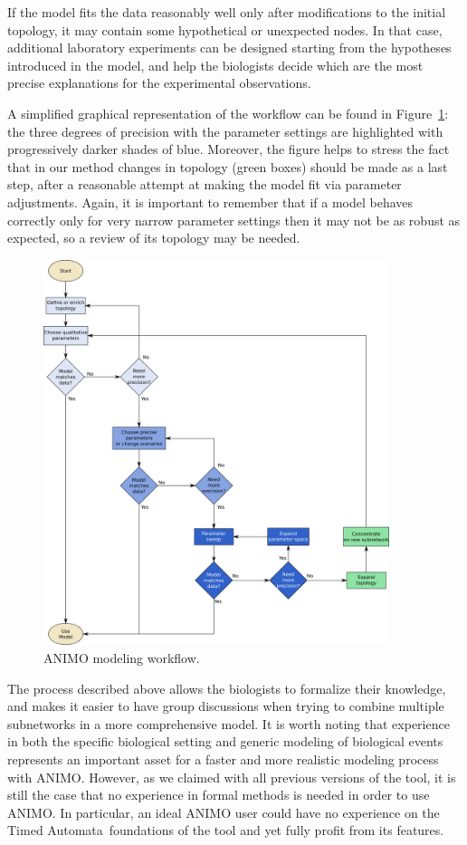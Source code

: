 \documentclass[submission,copyright,creativecommons]{eptcs}
\def\tas{Timed Automata}
\begin{document}
If the model fits the data reasonably well only after modifications to the initial topology, it may contain some hypothetical or unexpected nodes.
In that case, additional laboratory experiments can be designed starting from the hypotheses introduced in the model, and
help the biologists decide which are the most precise explanations for the experimental observations.

A simplified graphical representation of the workflow can be found in Figure~\ref{fig:workflow}: the three
degrees of precision with the parameter settings are highlighted with progressively darker shades of blue.
Moreover, the figure helps to stress the fact that in our method changes in topology (green boxes) should be made as a
last step, after a reasonable attempt at making the model fit via parameter adjustments.
Again, it is important to remember that if a model behaves correctly only for very narrow parameter settings
then it may not be as robust as expected, so a review of its topology may be needed.

\begin{figure}
\centering
\includegraphics[width=0.9\textwidth]{images/workflow}
\caption{ANIMO modeling workflow.\label{fig:workflow}}
\end{figure}


The process described above allows the biologists to formalize their knowledge,
and makes it easier to have group discussions when trying to combine multiple subnetworks in a more comprehensive model.
It is worth noting that experience in both the specific biological setting and generic modeling of biological
events represents an important asset for a faster and more realistic modeling process with ANIMO. However, as
we claimed with all previous versions of the tool, it is still the case that no experience in formal methods
is needed in order to use ANIMO. In particular, an ideal ANIMO user could have no experience on the \tas\ foundations
of the tool and yet fully profit from its features.
\end{document}

